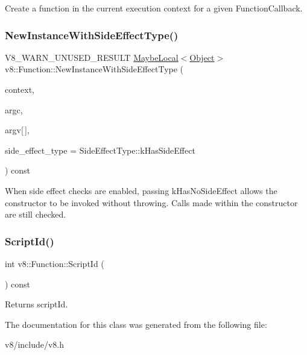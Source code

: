 Create a function in the current execution context for a given Function\+Callback. \mbox{\label{classv8_1_1Function_a3563e1a0f7de54f2d493a93a4e5e3b69}} 
\subsubsection{\texorpdfstring{New\+Instance\+With\+Side\+Effect\+Type()}{NewInstanceWithSideEffectType()}}
{\footnotesize\ttfamily V8\+\_\+\+W\+A\+R\+N\+\_\+\+U\+N\+U\+S\+E\+D\+\_\+\+R\+E\+S\+U\+LT \mbox{\hyperlink{classv8_1_1MaybeLocal}{Maybe\+Local}}$<$\mbox{\hyperlink{classv8_1_1Object}{Object}}$>$ v8\+::\+Function\+::\+New\+Instance\+With\+Side\+Effect\+Type (\begin{DoxyParamCaption}\item[{\mbox{\hyperlink{classv8_1_1Local}{Local}}$<$ Context $>$}]{context,  }\item[{int}]{argc,  }\item[{\mbox{\hyperlink{classv8_1_1Local}{Local}}$<$ \mbox{\hyperlink{classv8_1_1Value}{Value}} $>$}]{argv\mbox{[}$\,$\mbox{]},  }\item[{\mbox{\hyperlink{namespacev8_a29711319c2b9fc7716d65faee2f7b9cb}{Side\+Effect\+Type}}}]{side\+\_\+effect\+\_\+type = {\ttfamily SideEffectType\+:\+:kHasSideEffect} }\end{DoxyParamCaption}) const}

When side effect checks are enabled, passing k\+Has\+No\+Side\+Effect allows the constructor to be invoked without throwing. Calls made within the constructor are still checked. \mbox{\label{classv8_1_1Function_a5070c2657325ed6ca05ebb932c641438}} 
\subsubsection{\texorpdfstring{Script\+Id()}{ScriptId()}}
{\footnotesize\ttfamily int v8\+::\+Function\+::\+Script\+Id (\begin{DoxyParamCaption}{ }\end{DoxyParamCaption}) const}

Returns script\+Id. 

The documentation for this class was generated from the following file\+:\begin{DoxyCompactItemize}
\item 
v8/include/v8.\+h\end{DoxyCompactItemize}

